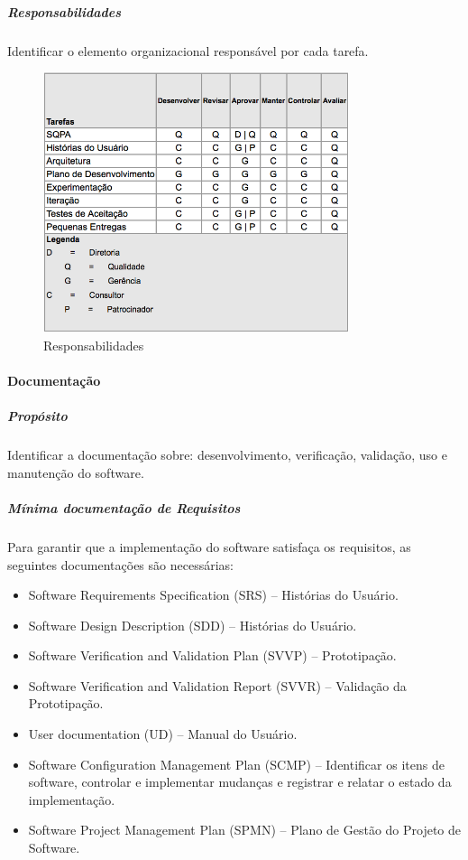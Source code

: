 \subparagraph{Responsabilidades}

Identificar o elemento organizacional responsável por cada tarefa.

\begin{figure}[H]
  \centering
  \includegraphics[width=0.8\textwidth]{softwareengineer/images/responsibilities-quality} 
  \caption{Responsabilidades}
  \label{fig:responsibilities-quality} 
\end{figure}

\paragraph{Documentação}

\subparagraph{Propósito}

Identificar a documentação sobre: desenvolvimento, verificação, validação, uso e manutenção do software.

\subparagraph{Mínima documentação de Requisitos}

Para garantir que a implementação do software satisfaça os requisitos, as seguintes documentações são necessárias:

\begin{itemize}
\item Software Requirements Specification (SRS) – Histórias do Usuário.

\item Software Design Description (SDD) – Histórias do Usuário.

\item Software Verification and Validation Plan (SVVP) – Prototipação.

\item Software Verification and Validation Report (SVVR) – Validação da Prototipação.

\item User documentation (UD) – Manual do Usuário.

\item Software Configuration Management Plan (SCMP) – Identificar os itens de software, controlar e implementar mudanças e registrar e relatar o estado da implementação.

\item Software Project Management Plan (SPMN) – Plano de Gestão do Projeto de Software.

\end{itemize}

